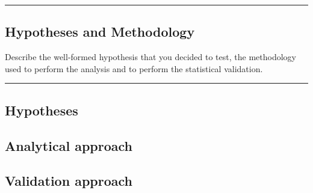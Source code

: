 {\color{gray}\hrule}
\begin{center}
\section{Hypotheses and Methodology}
Describe the well-formed hypothesis that you decided to test, the methodology used to perform the analysis and to perform the statistical validation.
\bigskip
\end{center}
{\color{gray}\hrule}
\begin{multicols}{2}
\subsection{Hypotheses}

\subsection{Analytical approach}

\subsection{Validation approach}

\end{multicols}